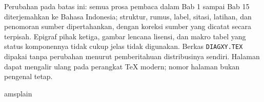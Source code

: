 \documentclass[11pt,reqno]{amsbook}
\theoremstyle{definition}
\theoremstyle{remark}
\numberwithin{equation}{section}
\begin{document}
Perubahan pada batas ini: semua prosa pembaca dalam Bab 1 sampai Bab 15
diterjemahkan ke Bahasa Indonesia; struktur, rumus, label, sitasi, latihan,
dan penomoran sumber dipertahankan, dengan koreksi sumber yang dicatat secara
terpisah. Epigraf pihak ketiga, gambar lencana lisensi, dan makro tabel yang
status komponennya tidak cukup jelas tidak digunakan. Berkas
\texttt{DIAGXY.TEX} dipakai tanpa perubahan menurut pemberitahuan distribusinya
sendiri. Halaman dapat
mengalir ulang pada perangkat TeX modern; nomor halaman bukan pengenal tetap.



\vfill\eject

\tableofcontents




\mainmatter




 
 
 
 
 
 
 
 
 
 
 
 
 
 
 






\backmatter


 \clearpage
  {amsplain}
 


 \cleardoublepage
 \printindex
\end{document}
